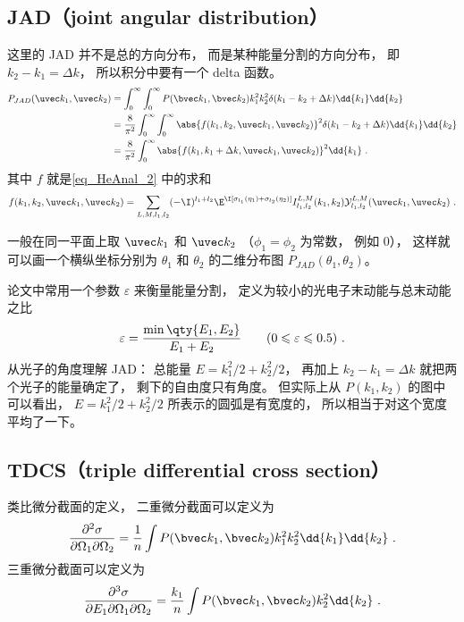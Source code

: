 \subsection{JAD（joint angular distribution）}
这里的 JAD 并不是总的方向分布， 而是某种能量分割的方向分布， 即 $k_2 - k_1 = \Delta k$， 所以积分中要有一个 delta 函数。
\begin{equation}\label{eq_HeAnal_22}
\begin{aligned}
P_{JAD}(\uvec k_1, \uvec k_2) &= \int_0^\infty \int_0^\infty P(\bvec k_1, \bvec k_2) k_1^2 k_2^2 \delta(k_1 - k_2 + \Delta k) \dd{k_1} \dd{k_2}\\
&= \frac{8}{\pi^2}\int_0^\infty \int_0^\infty \abs{f(k_1, k_2, \uvec k_1, \uvec k_2)}^2 \delta(k_1 - k_2 + \Delta k) \dd{k_1} \dd{k_2}\\
&= \frac{8}{\pi^2} \int_0^\infty \abs{f(k_1, k_1 + \Delta k, \uvec k_1, \uvec k_2)}^2 \dd{k_1}~.
\end{aligned}
\end{equation}
其中 $f$ 就是\autoref{eq_HeAnal_2} 中的求和
\begin{equation}
f(k_1, k_2, \uvec k_1, \uvec k_2) = \sum_{L, M, l_1, l_2} (-\I)^{l_1 + l_2} \E^{\I [\sigma_{l_1}(\eta_1) + \sigma_{l_2} (\eta_2)]}  I_{l_1, l_2}^{L, M}(k_1, k_2) \mathcal{Y}_{l_1, l_2}^{L, M}(\uvec k_1, \uvec k_2)~.
\end{equation}

一般在同一平面上取 $\uvec k_1$ 和 $\uvec k_2$ （$\phi_1 = \phi_2$ 为常数， 例如 0）， 这样就可以画一个横纵坐标分别为 $\theta_1$ 和 $\theta_2$ 的二维分布图 $P_{JAD}(\theta_1, \theta_2)$。

论文中常用一个参数 $\varepsilon$ 来衡量能量分割， 定义为较小的光电子末动能与总末动能之比
\begin{equation}
\varepsilon = \frac{\min\qty{E_1, E_2}}{E_1 + E_2} \qquad (0 \leqslant \varepsilon \leqslant 0.5)~.
\end{equation}
从光子的角度理解 JAD： 总能量 $E = k_1^2/2 + k_2^2/2$， 再加上 $k_2 - k_1 = \Delta k$ 就把两个光子的能量确定了， 剩下的自由度只有角度。 但实际上从 $P(k_1, k_2)$ 的图中可以看出， $E = k_1^2/2 + k_2^2/2$ 所表示的圆弧是有宽度的， 所以相当于对这个宽度平均了一下。

\subsection{TDCS（triple differential cross section）}
类比微分截面的定义， 二重微分截面可以定义为
\begin{equation}
\frac{\partial^2\sigma}{\partial\Omega_1\partial\Omega_2} = \frac{1}{n} \int P(\bvec k_1, \bvec k_2)k_1^2k_2^2\dd{k_1}\dd{k_2}~.
\end{equation}
三重微分截面可以定义为
\begin{equation}\label{eq_HeAnal_23}
\frac{\partial^3\sigma}{\partial E_1\partial\Omega_1\partial\Omega_2} = \frac{k_1}{n} \int P(\bvec k_1, \bvec k_2)k_2^2\dd{k_2}~.
\end{equation}

